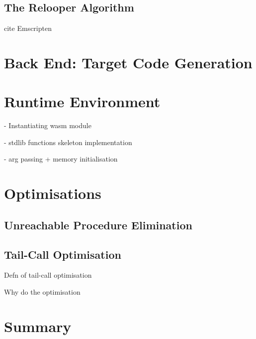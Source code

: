 \documentclass[00-main.tex]{subfiles}
\begin{document}
\subsection{The Relooper Algorithm}

\begin{Comment}
cite Emscripten \cite{emscripten}
\end{Comment}

\section{Back End: Target Code Generation}


\section{Runtime Environment}

\begin{Comment}
- Instantiating wasm module

- stdlib functions skeleton implementation

- arg passing + memory initialisation
\end{Comment}

\section{Optimisations}

\subsection{Unreachable Procedure Elimination}

\subsection{Tail-Call Optimisation}

\begin{Comment}
Defn of tail-call optimisation

Why do the optimisation
\end{Comment}

\section{Summary}
\end{document}
